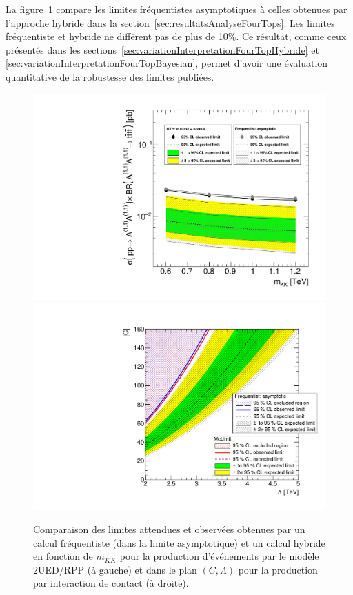 La figure~\ref{fig:ExclusionPlot_RPPFullStatAndCI_MclimitVsPureFrequentist} compare les limites fr\'equentistes asymptotiques \`a celles obtenues par l'approche hybride dans la section~\ref{sec:resultatsAnalyseFourTops}. 
Les limites fr\'equentiste et hybride ne diff\`erent pas de plus de 10\%. 
Ce r\'esultat, comme ceux pr\'esent\'es dans les sections~\ref{sec:variationInterpretationFourTopHybride} et \ref{sec:variationInterpretationFourTopBayesian}, permet d'avoir une \'evaluation quantitative de la robustesse des limites publi\'ees.
\enlargethispage{0.5cm}
\begin{figure}[!htb]
\begin{center}
\includegraphics[width=0.45\linewidth]{macros/ExclusionPlot_RPPFullStat_McLimitVsAsymptotic.pdf}
\includegraphics[width=0.47\linewidth]{macros/CVsLambdaForContactInteractionHybridVsAsymptotic.pdf}
\end{center}
\vspace*{-0.3cm}
\caption{Comparaison des limites attendues et observ\'ees obtenues par un calcul fr\'equentiste (dans la limite asymptotique) et un calcul hybride en fonction de $m_{KK}$ pour la production d'\'ev\'enements \fourtop{} par le mod\`ele 2UED/RPP (\`a gauche) et dans le plan $\left(C,\Lambda\right)$ pour la production par interaction de contact (\`a droite).\label{fig:ExclusionPlot_RPPFullStatAndCI_MclimitVsPureFrequentist}}
\end{figure}



